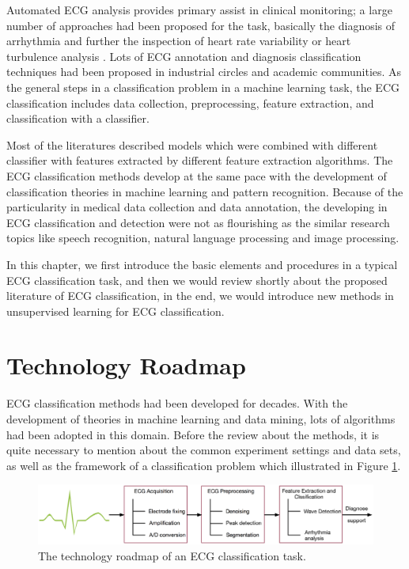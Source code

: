 \documentclass[graybox]{svmult}
\begin{document}
Automated ECG analysis provides primary assist in clinical monitoring; a large number of approaches had been proposed for the task, basically the diagnosis of arrhythmia and further the inspection of heart rate variability or heart turbulence analysis \citep{mar2011optimization}. 
Lots of  ECG annotation and diagnosis classification techniques had been proposed in industrial circles and academic communities. 
As the general steps in a classification problem in a machine learning task, the ECG classification includes data collection, preprocessing, feature extraction, and classification with a classifier. 

Most of the literatures described models which were combined with different classifier with features extracted by different feature extraction algorithms.
The ECG classification methods develop at the same pace with the development of classification theories in machine learning and pattern recognition. 
Because of the particularity in medical data collection and data annotation, the developing in ECG classification and detection were not as flourishing as the similar research topics like speech recognition, natural language processing and image processing.

In this chapter, we first introduce the basic elements and procedures in a typical ECG classification task, and then we would review shortly about the proposed literature of ECG classification, in the end, we would introduce new methods in unsupervised learning for ECG classification. 

\section{Technology Roadmap}
ECG classification methods had been developed for decades. With the development of theories in machine learning and data mining, lots of algorithms had been adopted in this domain. Before the review about the methods, it is quite necessary to mention about the common experiment settings and data sets, as well as the framework of a classification problem which illustrated in Figure \ref{fig:1}.


\begin{figure}[]
\sidecaption
\includegraphics[scale=.32]{classification}
%
%
\caption{The technology roadmap of an ECG classification task.}
\label{fig:1}       %
\end{figure}
\end{document}
